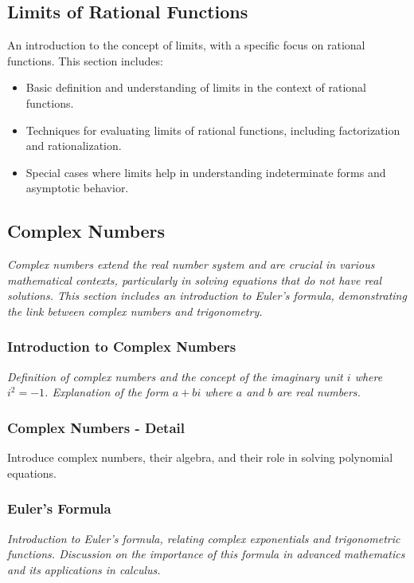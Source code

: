\documentclass[a4paper,12pt]{book}
\begin{document}
\subsection{Limits of Rational Functions}
\label{subsec:limits_rational_functions}
An introduction to the concept of limits, with a specific focus on rational functions. This section includes:


\begin{itemize}
    \item Basic definition and understanding of limits in the context of rational functions.
    \item Techniques for evaluating limits of rational functions, including factorization and rationalization.
    \item Special cases where limits help in understanding indeterminate forms and asymptotic behavior.
\end{itemize}


\subsection{Complex Numbers}
\label{subsec:complex_numbers}
\textit{Complex numbers extend the real number system and are crucial in various mathematical contexts, particularly in solving equations that do not have real solutions. This section includes an introduction to Euler's formula, demonstrating the link between complex numbers and trigonometry.}


\subsubsection{Introduction to Complex Numbers}
\textit{Definition of complex numbers and the concept of the imaginary unit \( i \) where \( i^2 = -1 \). Explanation of the form \( a + bi \) where \( a \) and \( b \) are real numbers.}


\subsubsection{Complex Numbers - Detail}
\label{subsec:complex_numbers_detail}
Introduce complex numbers, their algebra, and their role in solving polynomial equations.


\subsubsection{Euler's Formula}
\textit{Introduction to Euler's formula, relating complex exponentials and trigonometric functions. Discussion on the importance of this formula in advanced mathematics and its applications in calculus.}
\end{document}

